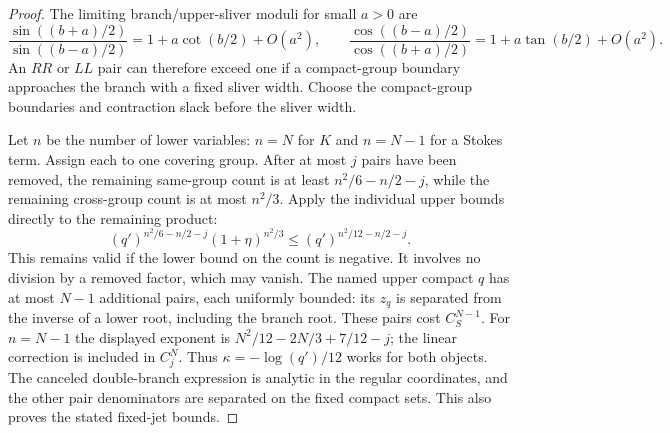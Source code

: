 \documentclass[11pt]{article}
\numberwithin{equation}{section}
\theoremstyle{definition}
\begin{document}
\begin{proof}
The limiting branch/upper-sliver moduli for small \(a>0\) are
\[
 \frac{\sin((b+a)/2)}{\sin((b-a)/2)}
   =1+a\cot(b/2)+O(a^2),\qquad
 \frac{\cos((b-a)/2)}{\cos((b+a)/2)}
   =1+a\tan(b/2)+O(a^2).
\]
An \(RR\) or \(LL\) pair can therefore exceed one if a compact-group
boundary approaches the branch with a fixed sliver width. Choose
the compact-group boundaries and contraction slack before the
sliver width.

Let \(n\) be the number of lower variables: \(n=N\) for \(K\)
and \(n=N-1\) for a Stokes term. Assign each to one covering group.
After at most \(j\) pairs have been removed, the remaining
same-group count is at least \(n^2/6-n/2-j\), while the
remaining cross-group count is at most \(n^2/3\). Apply the
individual upper bounds directly to the remaining product:
\[
 (q')^{n^2/6-n/2-j}(1+\eta)^{n^2/3}
       \le(q')^{n^2/12-n/2-j}.
\]
This remains valid if the lower bound on the count is negative.
It involves no division by a removed factor, which may vanish.
The named upper compact
\(q\) has at most \(N-1\) additional pairs, each uniformly
bounded: its \(z_q\) is separated from the inverse of a lower
root, including the branch root. These pairs cost \(C_S^{N-1}\).
For \(n=N-1\) the displayed exponent is
\(N^2/12-2N/3+7/12-j\); the linear correction is included in
\(C_j^N\). Thus \(\kappa=-\log(q')/12\) works for both objects.
The canceled double-branch expression is analytic in the regular
coordinates, and the other pair denominators are separated on the
fixed compact sets. This also proves the stated fixed-jet bounds.
\end{proof}
\end{document}

